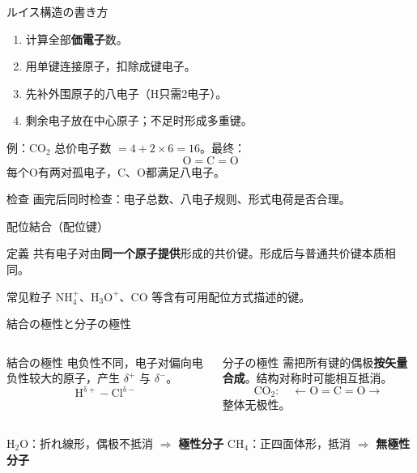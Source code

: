 \documentclass[notheorems,aspectratio=169]{beamer}
\newcommand{\jp}[1]{\textbf{\color{JapanBlue}#1}}
\newcommand{\key}[1]{\textbf{\color{ChinaRed}#1}}
\begin{document}
\begin{frame}{ルイス構造の書き方}
\begin{enumerate}
  \item 计算全部\jp{価電子}数。
  \item 用单键连接原子，扣除成键电子。
  \item 先补外围原子的八电子（H只需2电子）。
  \item 剩余电子放在中心原子；不足时形成多重键。
\end{enumerate}
\vfill
\begin{exampleblock}{例：CO$_2$}
总价电子数 $=4+2\times6=16$。最终：
\[
\boxed{\mathrm{O=C=O}}
\]
每个O有两对孤电子，C、O都满足八电子。
\end{exampleblock}
\begin{alertblock}{检查}
画完后同时检查：电子总数、八电子规则、形式电荷是否合理。
\end{alertblock}
\end{frame}

\begin{frame}{配位結合（配位键）}
\begin{block}{定義}
共有电子对由\key{同一个原子提供}形成的共价键。形成后与普通共价键本质相同。
\end{block}
\centering
{}
\vfill
\begin{exampleblock}{常见粒子}
$\mathrm{NH_4^+}$、$\mathrm{H_3O^+}$、$\mathrm{CO}$ 等含有可用配位方式描述的键。
\end{exampleblock}
\end{frame}

\begin{frame}{結合の極性と分子の極性}
\begin{columns}[c,onlytextwidth]
\begin{block}{結合の極性}
电负性不同，电子对偏向电负性较大的原子，产生 $\delta^+$ 与 $\delta^-$。
\[
\mathrm{H^{\delta+}-Cl^{\delta-}}
\]
\end{block}
\begin{alertblock}{分子の極性}
需把所有键的偶极\key{按矢量合成}。结构对称时可能相互抵消。
\[
\mathrm{CO_2}:\quad \leftarrow\mathrm{O=C=O}\rightarrow
\]
整体无极性。
\end{alertblock}
\end{columns}
\vfill
\begin{center}
H$_2$O：折れ線形，偶极不抵消 $\Rightarrow$ \jp{極性分子}\qquad
CH$_4$：正四面体形，抵消 $\Rightarrow$ \jp{無極性分子}
\end{center}
\end{frame}
\end{document}
